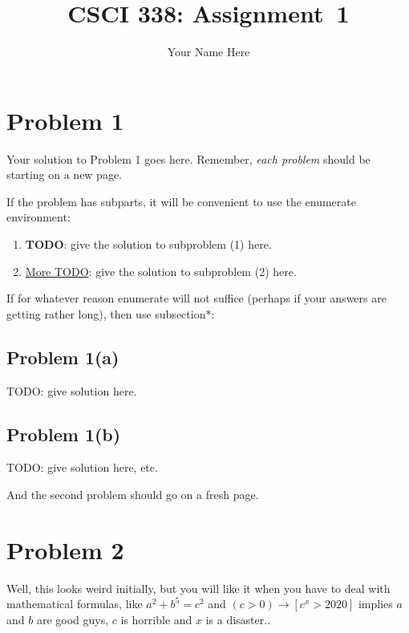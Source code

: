 \documentclass[11pt]{article}
\begin{document}
\date{}

\title{CSCI 338: Assignment~1}

\author{Your Name Here}


\maketitle


\section*{Problem 1}

Your solution to Problem 1 goes here. Remember, \emph{each problem} should be
starting on a new page.

If the problem has subparts, it will be convenient to use the enumerate
environment:
\begin{enumerate}
    \item {\bf TODO}: give the solution to subproblem (1) here.
    \item \underline{More TODO}: give the solution to subproblem (2) here.
\end{enumerate}

If for whatever reason enumerate will not suffice (perhaps if your answers are
getting rather long), then use subsection*:


\subsection*{Problem 1(a)}
TODO: give solution here.


\subsection*{Problem 1(b)}
TODO: give solution here, etc.


And the second problem should go on a fresh page.
\newpage

\section{Problem 2}

Well, this looks weird initially, but you will like it when you have to deal
with mathematical formulas, like $a^2+b^5=c^2$ and $(c>0)\rightarrow [c^{x}>2020]$ implies $a$ and $b$ are good guys, $c$ is horrible and $x$ is a disaster..
\newline
\end{document}
